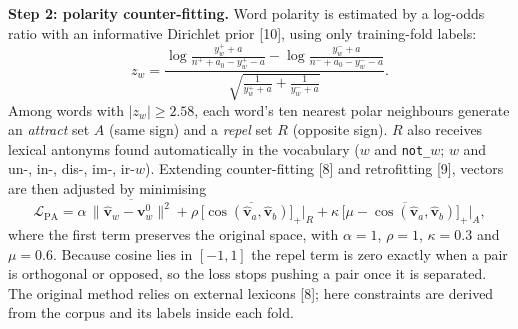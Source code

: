 \documentclass[11pt,a4paper]{article}
\begin{document}
\textbf{Step 2: polarity counter-fitting.} Word polarity is estimated by a log-odds ratio with an informative Dirichlet prior [10], using only training-fold labels:
\begin{equation}
z_w=\frac{\log\frac{y_w^{+}+a}{n^{+}+a_0-y_w^{+}-a}-\log\frac{y_w^{-}+a}{n^{-}+a_0-y_w^{-}-a}}{\sqrt{\frac{1}{y_w^{+}+a}+\frac{1}{y_w^{-}+a}}}.
\end{equation}
Among words with $|z_w|\ge 2.58$, each word's ten nearest polar neighbours generate an \emph{attract} set $A$ (same sign) and a \emph{repel} set $R$ (opposite sign). $R$ also receives lexical antonyms found automatically in the vocabulary ($w$ and \texttt{not\_}$w$; $w$ and un-, in-, dis-, im-, ir-$w$). Extending counter-fitting [8] and retrofitting [9], vectors are then adjusted by minimising
\begin{equation}
\mathcal{L}_{\mathrm{PA}}=\alpha\,\overline{\|\hat{\mathbf{v}}_w-\mathbf{v}_w^{0}\|^2}+\rho\,\overline{\big[\cos(\hat{\mathbf{v}}_a,\hat{\mathbf{v}}_b)\big]_+}\Big|_{R}+\kappa\,\overline{\big[\mu-\cos(\hat{\mathbf{v}}_a,\hat{\mathbf{v}}_b)\big]_+}\Big|_{A},
\end{equation}
where the first term preserves the original space, with $\alpha=1$, $\rho=1$, $\kappa=0.3$ and $\mu=0.6$. Because cosine lies in $[-1,1]$ the repel term is zero exactly when a pair is orthogonal or opposed, so the loss stops pushing a pair once it is separated. The original method relies on external lexicons [8]; here constraints are derived from the corpus and its labels inside each fold.
\end{document}
